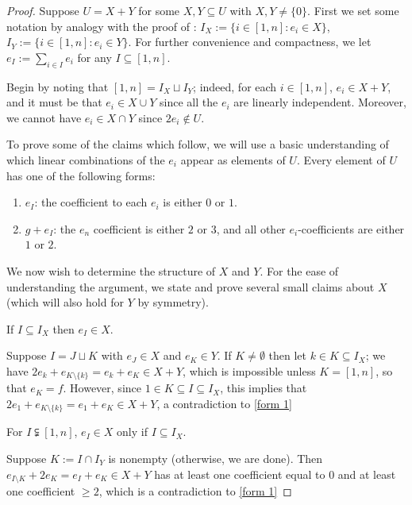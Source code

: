 \begin{proof}
	Suppose $U = X + Y$ for some $X,Y\subseteq U$ with $X,Y\neq \{0\}$.
	First we set some notation by analogy with the proof of \cite[Theorem 4.10]{fan-tringali18}: $I_X := \{i\in [ 1,n ]: e_i\in X\}$, $I_Y := \{i\in [1,n ]: e_i\in Y \}$.
	For further convenience and compactness, we let $e_I := \sum_{i\in I}e_i$ for any $I\subseteq [ 1,n ]$.
	
	Begin by noting that $[ 1,n ] = I_X \sqcup I_Y$; indeed, for each $i\in[ 1,n ]$, $e_i\in X+Y$, and it must be that $e_i\in X\cup Y$ since all the $e_i$ are linearly independent.  
	Moreover, we cannot have $e_i\in X\cap Y$ since $2e_i \notin U$.
	
	To prove some of the claims which follow, we will use a basic understanding of which linear combinations of the $e_i$ appear as elements of $U$.
	Every element of $U$ has one of the following forms:
	\begin{enumerate}[label={\rm ({\small F\arabic{*}})}]
		\item $e_I$: the coefficient to each $e_i$ is either $0$ or $1$. \label{form 1}
		\item $g+e_I$: the $e_n$ coefficient is either $2$ or $3$, and all other $e_i$-coefficients are either $1$ or $2$. \label{form 2}
	\end{enumerate}
	
	We now wish to determine the structure of $X$ and $Y$.
	For the ease of understanding the argument, we state and prove several small claims about $X$ (which will also hold for $Y$ by symmetry).
	
	\begin{claim} \label{cl:index implies sum}
	If $I\subseteq I_X$ then $e_I\in X$. 
	\end{claim}
	
	Suppose $I = J\sqcup K$ with $e_J\in X$ and $e_K\in Y$.
	If $K\neq \emptyset$ then let $k\in K\subseteq I_X$; we have $2e_k + e_{K\setminus\{k\}} = e_k + e_K\in X+Y$, which is impossible unless $K = [ 1,n]$, so that $e_K = f$.
	However, since $1\in K\subseteq I\subseteq I_X$, this implies that $2e_1 + e_{K\setminus\{k\}} = e_1 + e_K\in X+Y$, a contradiction to \ref{form 1}
	
	\begin{claim} \label{cl:sum implies index}
	For $I\subsetneqq [ 1,n ]$, $e_I\in X$ only if $I\subseteq I_X$.
	\end{claim}
	
	Suppose $K := I \cap I_Y$ is nonempty (otherwise, we are done).
	Then $e_{I\setminus K} + 2e_K = e_I + e_K \in X +Y$ has at least one coefficient equal to $0$ and at least one coefficient $\ge 2$, which is a contradiction to \ref{form 1}
	

\end{proof}
